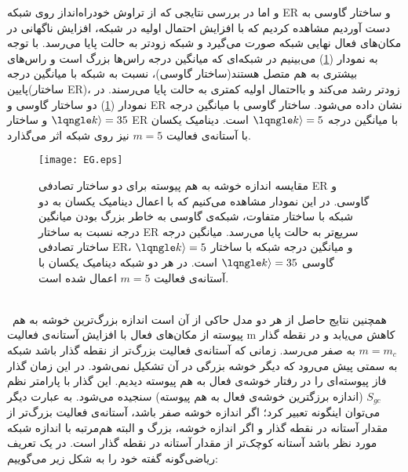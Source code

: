 و اما در بررسی نتایجی که از تراوش خود‌راه‌انداز روی شبکه ER و ساختار گاوسی  به دست آوردیم  مشاهده کردیم که با افزایش احتمال  اولیه در شبکه، افزایش ناگهانی در مکان‌های فعال نهایی شبکه صورت می‌گیرد و شبکه زودتر به حالت پایا می‌رسد. با توجه به نمودار (\ref{fig:EG}) می‌بینیم در شبکه‌ای که میانگین درجه راس‌ها بزرگ است و راس‌های بیشتری به هم متصل هستند(ساختار گاوسی)، نسبت به شبکه با میانگین درجه پایین(ساختار ER)، زودتر رشد می‌کند و بااحتمال اولیه کمتری به حالت پایا می‌رسند. در نمودار (\ref{fig:EG}) دو ساختار گاوسی و ER نشان داده می‌شود. ساختار گاوسی با میانگین درجه $\lqngle k \rangle = 35$  و ساختار ER با میانگین درجه $\lqngle k \rangle = 5$ است. دینامیک یکسان با آستانه‌ی فعالیت $m = 5$ نیز روی شبکه اثر می‌گذارد.
\begin{figure}[htbp]
\hspace*{0cm}
\centering
\texttt{[image: EG.eps]}
\caption [مقایسه اندازه خوشه به هم پیوسته برای دو ساختار تصادفی ER و گاوسی]{\footnotesize 
مقایسه اندازه خوشه به هم پیوسته برای دو ساختار تصادفی ER و گاوسی. در این نمودار مشاهده می‌کنیم که با اعمال دینامیک یکسان به دو شبکه با ساختار‌ متفاوت، شبکه‌ی گاوسی به خاطر بزرگ بودن میانگین درجه نسبت به ساختار ER سریع‌تر به حالت پایا می‌رسد. میانگین درجه ساختار تصادفی ER،  $\lqngle k \rangle = 5$ و میانگین درجه شبکه با ساختار گاوسی $\lqngle k \rangle = 35$ است. در هر دو شبکه دینامیک یکسان با آستانه‌ی فعالیت $m = 5$ اعمال شده است.}
\label{fig:EG}
\end{figure}\\\
 همچنین نتایج حاصل از هر دو مدل حاکی از آن است اندازه بزرگ‌ترین خوشه به هم پیوسته از مکان‌های فعال با افزایش آستانه‌ی فعالیت m کاهش می‌یابد و در  نقطه گذار $m = m_{c}$ به صفر می‌رسد. زمانی که آستانه‌ی فعالیت بزرگ‌تر از نقطه گذار باشد شبکه به سمتی پیش می‌رود که دیگر خوشه بزرگی در آن تشکیل نمی‌شود. در این زمان گذار فاز پیوسته‌ای را در رفتار خوشه‌ی فعال به هم پیوسته  دیدیم. این گذار با پارامتر نظم $S_{gc}$ (اندازه برزگترین خوشه‌ی فعال به هم پیوسته) سنجیده می‌شود. به عبارت دیگر می‌توان اینگونه تعبیر کرد؛ اگر اندازه خوشه صفر باشد، آستانه‌ی فعالیت بزرگ‌تر از مقدار  آستانه در نقطه گذار و اگر اندازه خوشه، بزرگ و البته هم‌مرتبه با اندازه شبکه مورد نظر باشد آستانه کوچک‌تر از مقدار  آستانه در نقطه گذار است. در یک تعریف ریاضی‌گونه گفته خود را به شکل زیر می‌گوییم:\\\\
 

